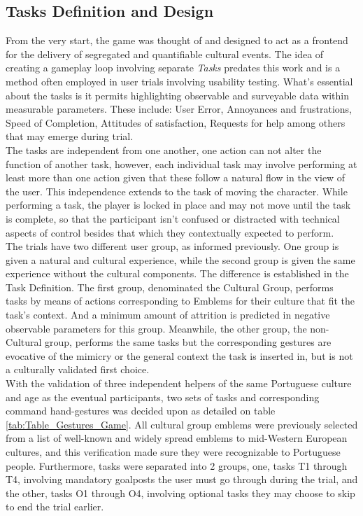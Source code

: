     \subsection{Tasks Definition and Design} \label{sec:develop_task_definition}
    From the very start, the game was thought of and designed to act as a frontend for the delivery of segregated and quantifiable cultural events. The idea of creating a gameplay loop involving separate \emph{Tasks} predates this work and is a method often employed in user trials involving usability testing. What’s essential about the tasks is it permits highlighting observable and surveyable data within measurable parameters. These include: User Error, Annoyances and frustrations, Speed of Completion, Attitudes of satisfaction, Requests for help among others that may emerge during trial.\\ 
    The tasks are independent from one another, one action can not alter the function of another task, however, each individual task may involve performing at least more than one action given that these follow a natural flow in the view of the user. This independence extends to the task of moving the character. While performing a task, the player is locked in place and may not move until the task is complete, so that the participant isn’t confused or distracted with technical aspects of control besides that which they contextually expected to perform.\\
    The trials have two different user group, as informed previously. One group is given a natural and cultural experience, while the second group is given the same experience without the cultural components. The difference is established in the Task Definition. The first group, denominated the Cultural Group, performs tasks by means of actions corresponding to Emblems for their culture that fit the task’s context. And a minimum amount of attrition is predicted in negative observable parameters for this group. Meanwhile, the other group, the non-Cultural group, performs the same tasks but the corresponding gestures are evocative of the mimicry or the general context the task is inserted in, but is not a culturally validated first choice.\\
    With the validation of three independent helpers of the same Portuguese culture and age as the eventual participants, two sets of tasks and corresponding command hand-gestures was decided upon as detailed on table \ref{tab:Table_Gestures_Game}. All cultural group emblems were previously selected from a list of well-known and widely spread emblems to mid-Western European cultures, and this verification made sure they were recognizable to Portuguese people. Furthermore, tasks were separated into 2 groups, one, tasks T1 through T4, involving mandatory goalposts the user must go through during the trial, and the other, tasks O1 through O4, involving optional tasks they may choose to skip to end the trial earlier.\\
    
